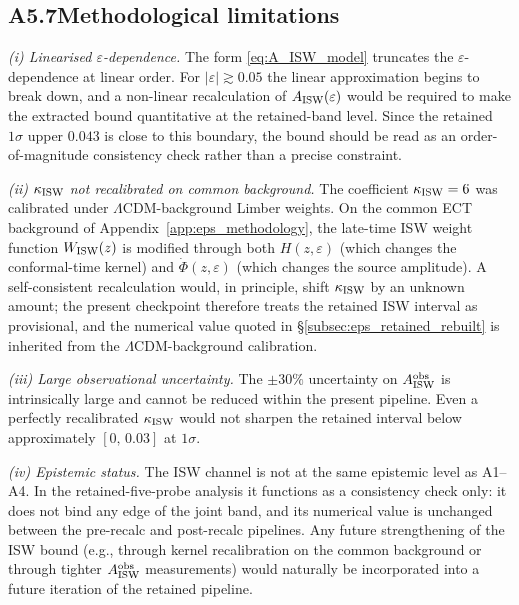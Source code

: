 \subsection*{A5.7\quad Methodological limitations}

\textit{(i) Linearised $\varepsilon$-dependence.}
The form \eqref{eq:A_ISW_model} truncates the
$\varepsilon$-dependence at linear order. For
$|\varepsilon| \gtrsim 0.05$ the linear approximation begins to
break down, and a non-linear recalculation of
$A_{\rm ISW}(\varepsilon)$ would be required to make the
extracted bound quantitative at the retained-band level. Since the
retained $1\sigma$ upper $0.043$ is close to this boundary, the
bound should be read as an order-of-magnitude consistency check
rather than a precise constraint.

\textit{(ii) $\kappa_{\rm ISW}$ not recalibrated on common
background.}
The coefficient $\kappa_{\rm ISW} = 6$ was calibrated under
$\Lambda$CDM-background Limber weights. On the common ECT
background of Appendix~\ref{app:eps_methodology}, the late-time
ISW weight function $W_{\rm ISW}(z)$ is modified through both
$H(z, \varepsilon)$ (which changes the conformal-time kernel) and
$\dot\Phi(z, \varepsilon)$ (which changes the source amplitude).
A self-consistent recalculation would, in principle, shift
$\kappa_{\rm ISW}$ by an unknown amount; the present checkpoint
therefore treats the retained ISW interval as provisional, and
the numerical value quoted in
\S\ref{subsec:eps_retained_rebuilt} is inherited from the
$\Lambda$CDM-background calibration.

\textit{(iii) Large observational uncertainty.}
The $\pm 30\%$ uncertainty on $A_{\rm ISW}^{\rm obs}$ is
intrinsically large and cannot be reduced within the present
pipeline. Even a perfectly recalibrated $\kappa_{\rm ISW}$ would
not sharpen the retained interval below approximately
$[0,\,0.03]$ at $1\sigma$.

\textit{(iv) Epistemic status.}
The ISW channel is not at the same epistemic level as A1--A4. In
the retained-five-probe analysis it functions as a consistency
check only: it does not bind any edge of the joint band, and its
numerical value is unchanged between the pre-recalc and
post-recalc pipelines. Any future strengthening of the ISW bound
(e.g., through kernel recalibration on the common background or
through tighter $A_{\rm ISW}^{\rm obs}$ measurements) would
naturally be incorporated into a future iteration of the retained
pipeline.

